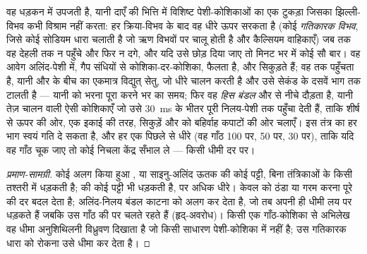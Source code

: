 \begin{proposition}[स्वचालिता और चालन]\label{prop:b2:heart:conduction}
वह धड़कन \emph{} में उपजती है, यानी दाएँ
 की भित्ति में विशिष्ट पेशी-कोशिकाओं का एक टुकड़ा जिसका
झिल्ली-विभव कभी विश्राम नहीं करता: हर क्रिया-विभव के बाद वह
धीरे ऊपर सरकता है (कोई \emph{गतिकारक विभव}, जिसे कोई
सोडियम धारा चलाती है जो ऋण विभवों पर चालू होती है और कैल्सियम
वाहिकाएँ) जब तक वह देहली तक न पहुँचे और फिर न दगे, और यदि उसे छोड़ दिया जाए तो
मिनट भर में कोई सौ बार। वह आवेग
अलिंद-पेशी में, गैप संधियों से कोशिका-दर-कोशिका, फैलता है, और
 सिकुड़ते हैं; वह \emph{} तक पहुँचता है, यानी
 और  के बीच का एकमात्र विद्युत् सेतु, जो
धीरे चालन करती है और उसे सेकंड के दसवें भाग तक टालती है --- यानी  को
 भरना पूरा करने भर का समय; फिर वह
\emph{हिस बंडल} और \emph{} से नीचे दौड़ता है, यानी तेज़ चालन वाली
ऐसी कोशिकाएँ जो उसे \qty{30}{ms} के भीतर पूरी निलय-पेशी तक
पहुँचा देती हैं, ताकि  शीर्ष से ऊपर की ओर,
एक इकाई की तरह, सिकुड़ें और  को बहिर्वाह कपाटों की ओर चलाएँ। इस
तंत्र का हर भाग स्वयं गति दे सकता है, और हर एक पिछले से
धीरे (वह गाँठ 100 पर,  50 पर, 
30 पर), ताकि यदि वह गाँठ चूक जाए तो कोई निचला केंद्र सँभाल ले --- किसी
धीमी दर पर।
\end{proposition}
\begin{proof}[प्रमाण-सामग्री]
कोई अलग किया हुआ , या साइनु-अलिंद ऊतक की कोई पट्टी, बिना तंत्रिकाओं के
किसी तश्तरी में धड़कती है;  की कोई पट्टी भी धड़कती है, पर अधिक धीरे।
केवल  को ठंडा या गरम करना पूरे
 की दर बदल देता है; अलिंद-निलय बंडल काटना  को अलग कर देता है,
जो तब अपनी ही धीमी लय पर धड़कते हैं जबकि 
उस गाँठ की पर चलते रहते हैं (हृद्-अवरोध)। किसी एक गाँठ-कोशिका से अभिलेख
वह धीमा अनुशिथिलनी विध्रुवण दिखाता है जो किसी साधारण पेशी-कोशिका
में नहीं है; उस गतिकारक धारा को रोकना उसे धीमा कर देता है।
\end{proof}

